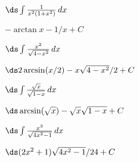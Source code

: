 \begin{exercises}
\begin{exercise} $\ds\int{1\over x^2(1+x^2)}\,dx$
\begin{answer} $-\arctan x - 1/x+C$
\end{answer}\end{exercise}

\begin{exercise} $\ds\int{x^2\over\sqrt{4-x^2}}\,dx$
\begin{answer} $\ds 2\arcsin(x/2)-x\sqrt{4-x^2}/2+C$
\end{answer}\end{exercise}

\begin{exercise} $\ds\int{\sqrt{x}\over\sqrt{1-x}}\,dx$
\begin{answer} $\ds \arcsin(\sqrt{x})-\sqrt{x}\sqrt{1-x}+C$
\end{answer}\end{exercise}

\begin{exercise} $\ds\int{x^3\over\sqrt{4x^2-1}}\,dx$
\begin{answer} $\ds (2x^2+1)\sqrt{4x^2-1}/24+C$
\end{answer}\end{exercise}

\endtwocol

\end{exercises}

